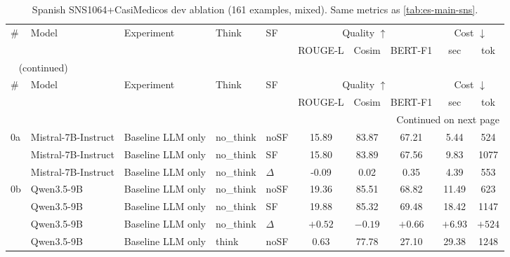 \begin{scriptsize}
\setlength{\tabcolsep}{3pt}
\setlength{\LTcapwidth}{\linewidth}
\begin{longtable}{l l l l l c c c c c}
\caption[Spanish Mixed dev ablation]{Spanish SNS1064+CasiMedicos dev ablation (161 examples, mixed). Same metrics as \autoref{tab:es-main-sns}.} \label{tab:es-main-mixed} \\
\toprule
\# & Model & Experiment & Think & SF & \multicolumn{3}{c}{Quality $\uparrow$} & \multicolumn{2}{c}{Cost $\downarrow$} \\
\cmidrule(lr){6-8}\cmidrule(lr){9-10}
\multicolumn{1}{l}{} & \multicolumn{1}{l}{} & \multicolumn{1}{l}{} & \multicolumn{1}{l}{} & \multicolumn{1}{l}{} & \multicolumn{1}{c}{ROUGE-L} & \multicolumn{1}{c}{Cosim} & \multicolumn{1}{c}{BERT-F1} & \multicolumn{1}{c}{sec} & \multicolumn{1}{c}{tok} \\
\midrule
\endfirsthead
\multicolumn{10}{l}{\tablename\ \thetable{} (continued)} \\
\toprule
\# & Model & Experiment & Think & SF & \multicolumn{3}{c}{Quality $\uparrow$} & \multicolumn{2}{c}{Cost $\downarrow$} \\
\cmidrule(lr){6-8}\cmidrule(lr){9-10}
\multicolumn{1}{l}{} & \multicolumn{1}{l}{} & \multicolumn{1}{l}{} & \multicolumn{1}{l}{} & \multicolumn{1}{l}{} & \multicolumn{1}{c}{ROUGE-L} & \multicolumn{1}{c}{Cosim} & \multicolumn{1}{c}{BERT-F1} & \multicolumn{1}{c}{sec} & \multicolumn{1}{c}{tok} \\
\midrule
\endhead
\midrule
\multicolumn{10}{r}{Continued on next page} \\
\endfoot
\bottomrule
\endlastfoot
0a & Mistral-7B-Instruct & Baseline LLM only & no\_think & noSF & 15.89 & 83.87 & 67.21 & 5.44 & 524 \\
 & Mistral-7B-Instruct & Baseline LLM only & no\_think & SF & 15.80 & 83.89 & 67.56 & 9.83 & 1077 \\
 & Mistral-7B-Instruct & Baseline LLM only & no\_think & $\Delta$ & -0.09 & 0.02 & 0.35 & 4.39 & 553 \\
0b & Qwen3.5-9B & Baseline LLM only & no\_think & noSF & 19.36 & 85.51 & 68.82 & 11.49 & 623 \\
 & Qwen3.5-9B & Baseline LLM only & no\_think & SF & 19.88 & 85.32 & 69.48 & 18.42 & 1147 \\
 & Qwen3.5-9B & Baseline LLM only & no\_think & $\Delta$ & $+0.52$ & $-0.19$ & $+0.66$ & $+6.93$ & $+524$ \\
 & Qwen3.5-9B & Baseline LLM only & think & noSF & 0.63 & 77.78 & 27.10 & 29.38 & 1248 \\

\end{longtable}
\end{scriptsize}

